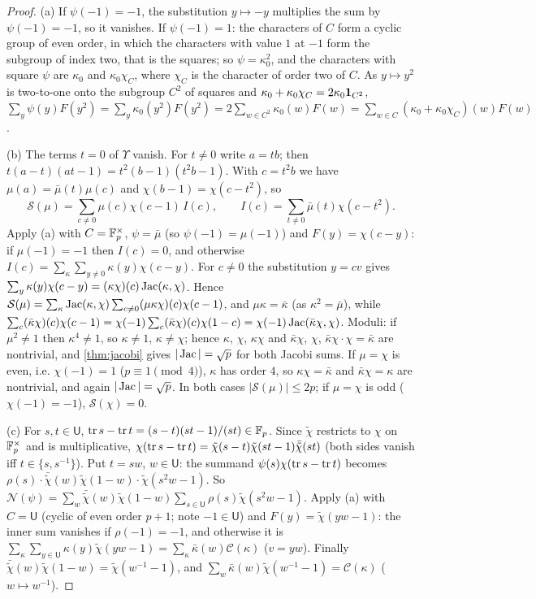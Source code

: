 \begin{proof}
(a) If $\psi(-1)=-1$, the substitution $y\mapsto-y$ multiplies the sum by
$\psi(-1)=-1$, so it vanishes. If $\psi(-1)=1$: the characters of $C$ form a
cyclic group of even order, in which the characters with value $1$ at $-1$
form the subgroup of index two, that is the squares; so $\psi=\kappa_0^2$, and
the characters with square $\psi$ are $\kappa_0$ and $\kappa_0\chi_C$, where
$\chi_C$ is the character of order two of $C$. As $y\mapsto y^2$ is two-to-one
onto the subgroup $C^2$ of squares and $\kappa_0+\kappa_0\chi_C=2\kappa_0\mathbf 1_{C^2}$,
$\sum_y\psi(y)F(y^2)=\sum_y\kappa_0(y^2)F(y^2)=2\sum_{w\in C^2}\kappa_0(w)F(w)
=\sum_{w\in C}(\kappa_0+\kappa_0\chi_C)(w)F(w)$.

(b) The terms $t=0$ of $\Upsilon$ vanish. For $t\ne0$ write $a=tb$; then
$t(a-t)(at-1)=t^2(b-1)(t^2b-1)$. With $c=t^2b$ we have
$\mu(a)=\bar\mu(t)\mu(c)$ and $\chi(b-1)=\chi(c-t^2)$, so
\[
  \mathcal S(\mu)=\sum_{c\ne0}\mu(c)\chi(c-1)\,I(c),\qquad
  I(c)=\sum_{t\ne0}\bar\mu(t)\chi(c-t^2).
\]
Apply (a) with $C=\mathbb F_p^\times$, $\psi=\bar\mu$ (so $\psi(-1)=\mu(-1)$) and
$F(y)=\chi(c-y)$: if $\mu(-1)=-1$ then $I(c)=0$, and otherwise
$I(c)=\sum_\kappa\sum_{y\ne0}\kappa(y)\chi(c-y)$. For $c\ne0$ the substitution
$y=cv$ gives $\sum_y\kappa(y)\chi(c-y)=(\kappa\chi)(c)\operatorname{Jac}(\kappa,\chi)$. Hence
$\mathcal S(\mu)=\sum_\kappa\operatorname{Jac}(\kappa,\chi)\sum_{c\ne0}(\mu\kappa\chi)(c)\chi(c-1)$,
and $\mu\kappa=\bar\kappa$ (as $\kappa^2=\bar\mu$), while
$\sum_c(\bar\kappa\chi)(c)\chi(c-1)=\chi(-1)\sum_c(\bar\kappa\chi)(c)\chi(1-c)
=\chi(-1)\operatorname{Jac}(\bar\kappa\chi,\chi)$.
Moduli: if $\mu^2\ne1$ then $\kappa^4\ne1$, so $\kappa\ne1$, $\kappa\ne\chi$;
hence $\kappa$, $\chi$, $\kappa\chi$ and $\bar\kappa\chi$, $\chi$,
$\bar\kappa\chi\cdot\chi=\bar\kappa$ are nontrivial, and \cref{thm:jacobi} gives
$|\operatorname{Jac}|=\sqrt p$ for both Jacobi sums. If $\mu=\chi$ is even,
i.e. $\chi(-1)=1$ ($p\equiv1\pmod4$), $\kappa$ has order $4$, so
$\kappa\chi=\bar\kappa$ and $\bar\kappa\chi=\kappa$ are
nontrivial, and again $|\operatorname{Jac}|=\sqrt p$. In both cases
$|\mathcal S(\mu)|\le2p$; if $\mu=\chi$ is odd
($\chi(-1)=-1$), $\mathcal S(\chi)=0$.

(c) For $s,t\in\mathsf U$, $\operatorname{tr} s-\operatorname{tr} t=(s-t)(st-1)/(st)\in\mathbb F_p$. Since
$\tilde\chi$ restricts to $\chi$ on $\mathbb F_p^\times$ and is multiplicative,
$\chi(\operatorname{tr} s-\operatorname{tr} t)=\tilde\chi(s-t)\tilde\chi(st-1)\bar{\tilde\chi}(st)$ (both
sides vanish iff $t\in\{s,s^{-1}\}$). Put $t=sw$, $w\in\mathsf U$: the summand
$\psi(s)\chi(\operatorname{tr} s-\operatorname{tr} t)$ becomes
$\rho(s)\cdot\bar{\tilde\chi}(w)\tilde\chi(1-w)\cdot\tilde\chi(s^2w-1)$. So
$\mathcal N(\psi)=\sum_{w}\bar{\tilde\chi}(w)\tilde\chi(1-w)
\sum_{s\in\mathsf U}\rho(s)\tilde\chi(s^2w-1)$. Apply (a) with $C=\mathsf U$
(cyclic of even order $p+1$; note $-1\in\mathsf U$) and
$F(y)=\tilde\chi(yw-1)$: the inner sum vanishes if $\rho(-1)=-1$, and otherwise
it is $\sum_\kappa\sum_{y\in\mathsf U}\kappa(y)\tilde\chi(yw-1)
=\sum_\kappa\bar\kappa(w)\mathcal C(\kappa)$ ($v=yw$). Finally
$\bar{\tilde\chi}(w)\tilde\chi(1-w)=\tilde\chi(w^{-1}-1)$, and
$\sum_w\bar\kappa(w)\tilde\chi(w^{-1}-1)=\mathcal C(\kappa)$ ($w\mapsto w^{-1}$).


\end{proof}
